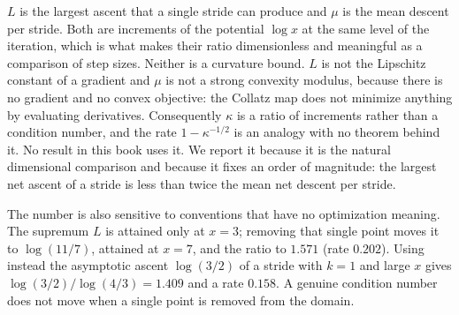\begin{remark}\label{rem:nesterovlimits}
$L$ is the largest ascent that a single stride can produce and $\mu$ is the
mean descent per stride.  Both are increments of the potential $\log x$ at
the same level of the iteration, which is what makes their ratio
dimensionless and meaningful as a comparison of step sizes.  Neither is a
curvature bound.  $L$ is not the Lipschitz constant of a gradient and $\mu$ is
not a strong convexity modulus, because there is no gradient and no convex
objective: the Collatz map does not minimize anything by evaluating
derivatives.  Consequently $\kappa$ is a ratio of increments rather than a
condition number, and the rate $1-\kappa^{-1/2}$ is an analogy with no
theorem behind it.  No result in this book uses it.  We report it because it
is the natural dimensional comparison and because it fixes an order of
magnitude: the largest net ascent of a stride is less than twice the mean net descent per stride.

The number is also sensitive to conventions that have no optimization
meaning.  The supremum $L$ is attained only at $x=3$; removing that single point moves it to $\log(11/7)$, attained at $x=7$, and the ratio to $1.571$ (rate $0.202$).
Using instead the
asymptotic ascent $\log(3/2)$ of a stride with $k=1$ and large $x$ gives
$\log(3/2)/\log(4/3)=1.409$ and a rate $0.158$.  A genuine condition number
does not move when a single point is removed from the domain.
\end{remark}

